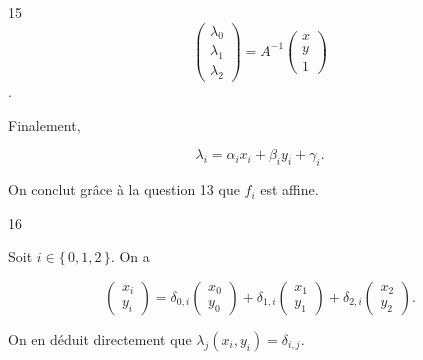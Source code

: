 \begin{reponse}{15}
$$
\begin{pmatrix}
    \lambda_0 \\
    \lambda_1 \\
    \lambda_2
\end{pmatrix} =A^{-1} \begin{pmatrix}
    x \\
    y \\
    1
\end{pmatrix}$$.

Finalement, 

\[
    \lambda_i = \alpha_i x_i + \beta_i y_i + \gamma_i.
\]

On conclut grâce à la question 13 que $f_i$ est affine.

\end{reponse}


\begin{reponse}{16}

Soit $i \in \{ \, 0,1,2 \, \}$. On a 

$$
\begin{pmatrix}
    x_i \\
    y_i
\end{pmatrix} = \delta_{0,i} \begin{pmatrix}
    x_0 \\
    y_0
\end{pmatrix} + \delta_{1,i} \begin{pmatrix}
    x_1 \\
    y_1
\end{pmatrix} + \delta_{2,i} \begin{pmatrix}
    x_2 \\
    y_2
\end{pmatrix}.
$$

On en déduit directement que $\lambda_j(x_i,y_i)= \delta_{i,j}$.
\end{reponse}


